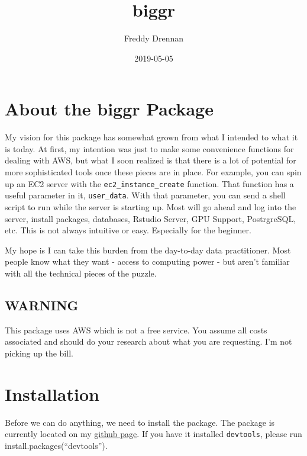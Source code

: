 \documentclass[]{book}
\title{biggr}
\author{Freddy Drennan}
\date{2019-05-05}
\begin{document}
\maketitle

{
\setcounter{tocdepth}{1}
\tableofcontents
}
\hypertarget{about-the-biggr-package}{%
\chapter{About the biggr Package}\label{about-the-biggr-package}}

My vision for this package has somewhat grown from what I intended to what it is today. At first, my intention was just to make some convenience functions for dealing with AWS, but what I soon realized is that there is a lot of potential for more sophisticated tools once these pieces are in place. For example, you can spin up an EC2 server with the \texttt{ec2\_instance\_create} function. That function has a useful parameter in it, \texttt{user\_data}. With that parameter, you can send a shell script to run while the server is starting up. Most will go ahead and log into the server, install packages, databases, Rstudio Server, GPU Support, PostrgreSQL, etc. This is not always intuitive or easy. Especially for the beginner.

My hope is I can take this burden from the day-to-day data practitioner. Most people know what they want - access to computing power - but aren't familiar with all the technical pieces of the puzzle.

\hypertarget{warning}{%
\section{WARNING}\label{warning}}

This package uses AWS which is not a free service. You assume all costs associated and should do your research about what you are requesting. I'm not picking up the bill.

\hypertarget{installation}{%
\chapter{Installation}\label{installation}}

Before we can do anything, we need to install the package. The package is currently located on my \href{https://github.com/fdrennan/biggr}{github page}. If you have it installed \texttt{devtools}, please run install.packages(``devtools'').
\end{document}
